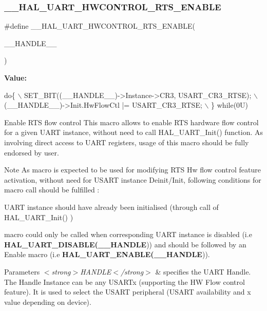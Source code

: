 \subsubsection{\texorpdfstring{\+\_\+\+\_\+\+H\+A\+L\+\_\+\+U\+A\+R\+T\+\_\+\+H\+W\+C\+O\+N\+T\+R\+O\+L\+\_\+\+R\+T\+S\+\_\+\+E\+N\+A\+B\+LE}{\_\_HAL\_UART\_HWCONTROL\_RTS\_ENABLE}}
{\footnotesize\ttfamily \#define \+\_\+\+\_\+\+H\+A\+L\+\_\+\+U\+A\+R\+T\+\_\+\+H\+W\+C\+O\+N\+T\+R\+O\+L\+\_\+\+R\+T\+S\+\_\+\+E\+N\+A\+B\+LE(\begin{DoxyParamCaption}\item[{}]{\+\_\+\+\_\+\+H\+A\+N\+D\+L\+E\+\_\+\+\_\+ }\end{DoxyParamCaption})}

{\bfseries Value\+:}
\begin{DoxyCode}
\textcolor{keywordflow}{do}\{                                                     \(\backslash\)
    SET\_BIT((\_\_HANDLE\_\_)->Instance->CR3, USART\_CR3\_RTSE); \(\backslash\)
    (\_\_HANDLE\_\_)->Init.HwFlowCtl |= USART\_CR3\_RTSE;       \(\backslash\)
  \} \textcolor{keywordflow}{while}(0U)
\end{DoxyCode}


Enable R\+TS flow control This macro allows to enable R\+TS hardware flow control for a given U\+A\+RT instance, without need to call H\+A\+L\+\_\+\+U\+A\+R\+T\+\_\+\+Init() function. As involving direct access to U\+A\+RT registers, usage of this macro should be fully endorsed by user. 

\begin{DoxyNote}{Note}
As macro is expected to be used for modifying R\+TS Hw flow control feature activation, without need for U\+S\+A\+RT instance Deinit/\+Init, following conditions for macro call should be fulfilled \+:
\begin{DoxyItemize}
\item U\+A\+RT instance should have already been initialised (through call of H\+A\+L\+\_\+\+U\+A\+R\+T\+\_\+\+Init() )
\item macro could only be called when corresponding U\+A\+RT instance is disabled (i.\+e {\bfseries H\+A\+L\+\_\+\+U\+A\+R\+T\+\_\+\+D\+I\+S\+A\+B\+LE(\+\_\+\+\_\+\+H\+A\+N\+D\+LE})) and should be followed by an Enable macro (i.\+e {\bfseries H\+A\+L\+\_\+\+U\+A\+R\+T\+\_\+\+E\+N\+A\+B\+LE(\+\_\+\+\_\+\+H\+A\+N\+D\+LE})). 
\end{DoxyItemize}
\end{DoxyNote}

\begin{DoxyParams}{Parameters}
{\em $<$strong$>$\+H\+A\+N\+D\+L\+E$<$/strong$>$} & specifies the U\+A\+RT Handle. The Handle Instance can be any U\+S\+A\+R\+Tx (supporting the HW Flow control feature). It is used to select the U\+S\+A\+RT peripheral (U\+S\+A\+RT availability and x value depending on device). \\
\hline
\end{DoxyParams}


